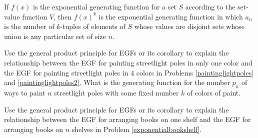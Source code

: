 \begin{corollary} If $f(x)$ is the exponential generating function for
a set $S$ according to the set-value function $V$, then $f(x)^k$ is the
exponential generating function in which $a_n$ is the number of
$k$-tuples of elements of $S$ whose values are disjoint sets whose union
is any particular set of size $n$.\label{EGFtothen}\end{corollary}

\bp 

\itemes Use the general product principle for EGFs or its corollary to
explain the relationship between the EGF for painting streetlight poles
in only one color and the EGF for painting streetlight poles in $4$
colors in Problems \ref{paintinglightpoles} and \ref{paintinglightpoles2}.
What is the generating function
for the number $p_n$ of ways to paint  $n$ streetlight poles
with some fixed number $k$ of colors of paint.

\itemes Use the general product principle for EGFs or its corollary to
explain the relationship between the EGF for arranging books on one shelf
and the EGF for arranging books on
$n$ shelves in Problem
\ref{exponentialbookshelf}.


